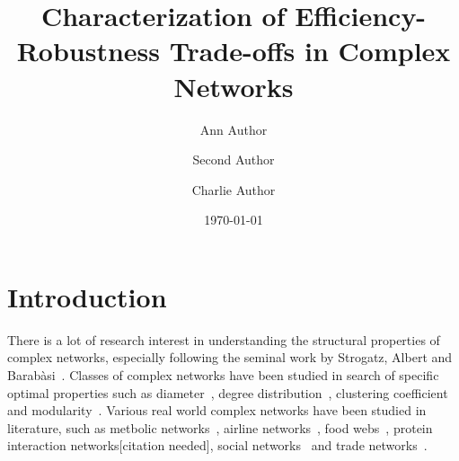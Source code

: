 \documentclass[twocolumn,showpacs,preprintnumbers,amsmath,amssymb]{revtex4}
\begin{document}

\title{Characterization of Efficiency-Robustness Trade-offs in Complex Networks}%

\author{Ann  Author}
\author{Second Author}%
%

\author{Charlie Author}
%

\date{\today}%


\maketitle

\section{\label{sec:intro}Introduction}

There is a lot of research interest in understanding the structural properties of complex networks, especially following the seminal work by Strogatz, Albert and Barab\`{a}si~\cite{strogatz01, albert02, barabasi03}. Classes of complex networks have been studied in search of specific optimal properties such as diameter~\cite{barabasi99}, degree distribution~\cite{albert02}, clustering coefficient~\cite{watts98} and modularity~\cite{newman}. Various real world complex networks have been studied in literature, such as metbolic networks~\cite{guimera07, smart08}, airline networks~\cite{guimera04, guimera05}, food webs~\cite{williams98, cochen}, protein interaction networks[citation needed], social networks~\cite{newman} and trade networks~\cite{vespignani}. %
\end{document}
